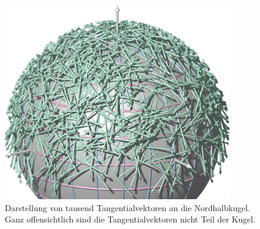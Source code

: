 %
%
%
\begin{figure}
\centering
\includegraphics[width=10cm]{chapters/020-koordinaten/images/tangentialvektoren.jpg}
\caption{Darstellung von tausend Tangentialvektoren an die Nordhalbkugel.
Ganz offensichtlich sind die Tangentialvektoren nicht Teil der Kugel.
\label{buch:koordinaten:fig:tangentialvektoren}}
\end{figure}
